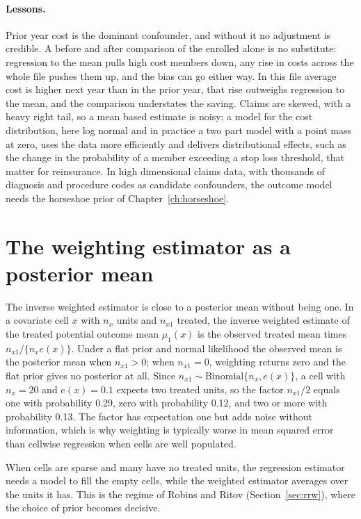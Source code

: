\paragraph{Lessons.} Prior year cost is the dominant confounder, and without it no adjustment is credible. A before and after comparison of the enrolled alone is no substitute: regression to the mean pulls high cost members down, any rise in costs across the whole file pushes them up, and the bias can go either way. In this file average cost is higher next year than in the prior year, that rise outweighs regression to the mean, and the comparison understates the saving. Claims are skewed, with a heavy right tail, so a mean based estimate is noisy; a model for the cost distribution, here log normal and in practice a two part model with a point mass at zero, uses the data more efficiently and delivers distributional effects, such as the change in the probability of a member exceeding a stop loss threshold, that matter for reinsurance. In high dimensional claims data, with thousands of diagnosis and procedure codes as candidate confounders, the outcome model needs the horseshoe prior of Chapter~\ref{ch:horseshoe}.

\section{The weighting estimator as a posterior mean}

The inverse weighted estimator is close to a posterior mean without being one. In a covariate cell $x$ with $n_x$ units and $n_{x1}$ treated, the inverse weighted estimate of the treated potential outcome mean $\mu_1(x)$ is the observed treated mean times $n_{x1}/\{n_xe(x)\}$. Under a flat prior and normal likelihood the observed mean is the posterior mean when $n_{x1} > 0$; when $n_{x1} = 0$, weighting returns zero and the flat prior gives no posterior at all. Since $n_{x1} \sim \mathrm{Binomial}\{n_x, e(x)\}$, a cell with $n_x = 20$ and $e(x) = 0.1$ expects two treated units, so the factor $n_{x1}/2$ equals one with probability 0.29, zero with probability 0.12, and two or more with probability 0.13. The factor has expectation one but adds noise without information, which is why weighting is typically worse in mean squared error than cellwise regression when cells are well populated.

When cells are sparse and many have no treated units, the regression estimator needs a model to fill the empty cells, while the weighted estimator averages over the units it has. This is the regime of Robins and Ritov (Section~\ref{sec:rrw}), where the choice of prior becomes decisive.

